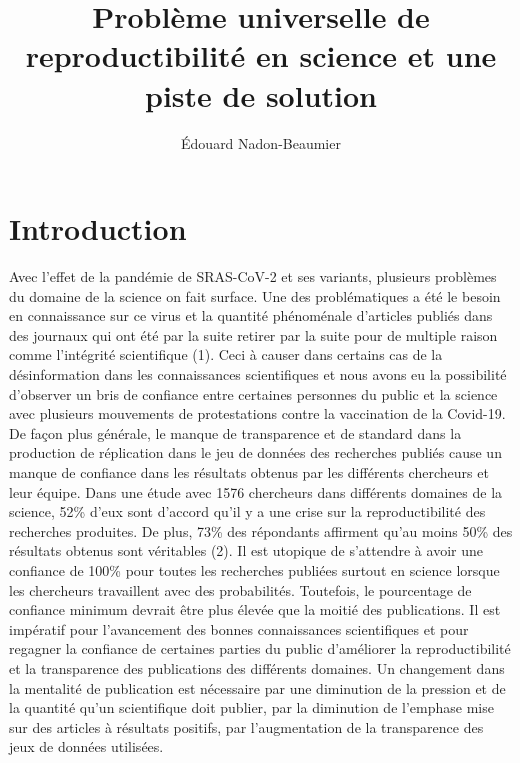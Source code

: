 \documentclass[9pt,twocolumn,twoside,]{pnas-new}
\title{Problème universelle de reproductibilité en science et une piste
de solution}
\author[a]{Édouard Nadon-Beaumier}
\affil[a]{Université de Sherbrooke, Départment de biologie, 2500
Boulevard de l'Université, Sherbrooke, Québec, G1V 0A9}
\begin{document}
\verticaladjustment{-2pt}



\maketitle
\thispagestyle{firststyle}


\acknow{}

\hypertarget{introduction}{%
\section{Introduction}\label{introduction}}

Avec l'effet de la pandémie de SRAS-CoV-2 et ses variants, plusieurs
problèmes du domaine de la science on fait surface. Une des
problématiques a été le besoin en connaissance sur ce virus et la
quantité phénoménale d'articles publiés dans des journaux qui ont été
par la suite retirer par la suite pour de multiple raison comme
l'intégrité scientifique (1). Ceci à causer dans certains cas de la
désinformation dans les connaissances scientifiques et nous avons eu la
possibilité d'observer un bris de confiance entre certaines personnes du
public et la science avec plusieurs mouvements de protestations contre
la vaccination de la Covid-19. De façon plus générale, le manque de
transparence et de standard dans la production de réplication dans le
jeu de données des recherches publiés cause un manque de confiance dans
les résultats obtenus par les différents chercheurs et leur équipe. Dans
une étude avec 1576 chercheurs dans différents domaines de la science,
52\% d'eux sont d'accord qu'il y a une crise sur la reproductibilité des
recherches produites. De plus, 73\% des répondants affirment qu'au moins
50\% des résultats obtenus sont véritables (2). Il est utopique de
s'attendre à avoir une confiance de 100\% pour toutes les recherches
publiées surtout en science lorsque les chercheurs travaillent avec des
probabilités. Toutefois, le pourcentage de confiance minimum devrait
être plus élevée que la moitié des publications. Il est impératif pour
l'avancement des bonnes connaissances scientifiques et pour regagner la
confiance de certaines parties du public d'améliorer la reproductibilité
et la transparence des publications des différents domaines. Un
changement dans la mentalité de publication est nécessaire par une
diminution de la pression et de la quantité qu'un scientifique doit
publier, par la diminution de l'emphase mise sur des articles à
résultats positifs, par l'augmentation de la transparence des jeux de
données utilisées.
\end{document}
